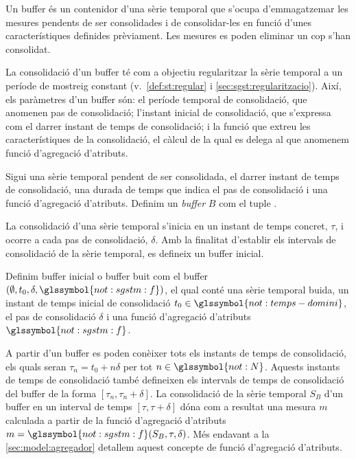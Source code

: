 Un buffer és un contenidor d'una sèrie temporal que s'ocupa
d'emmagatzemar les mesures pendents de ser consolidades i de
consolidar-les en funció d'unes característiques definides
prèviament. Les mesures es poden eliminar un cop s'han consolidat.

La consolidació d'un buffer té com a objectiu regularitzar la sèrie
temporal a un període de mostreig constant
(v.~\autoref{def:st:regular} i \autoref{sec:sgst:regularitzacio}).
Així, els paràmetres d'un buffer són: el període temporal de
consolidació, que anomenen pas de consolidació; l'instant inicial de
consolidació, que s'expressa com el darrer instant de temps de
consolidació; i la funció que extreu les
característiques de la consolidació, el càlcul de la qual es delega al
que anomenem funció d'agregació d'atributs.


\begin{definition}[Buffer]
  Sigui  una sèrie temporal pendent de
  ser consolidada,  el darrer
  instant de temps de consolidació,
   una durada de temps que
  indica el pas de consolidació i  una
  funció d'agregació d'atributs.  Definim un \emph{buffer} $B$ com el
  tuple
  .
\end{definition}

La consolidació d'una sèrie temporal s'inicia en un instant de temps
concret, $\tau$, i ocorre a cada pas de consolidació, $\delta$. Amb la
finalitat d'establir els intervals de consolidació de la sèrie
temporal, es defineix un buffer inicial.

\begin{definition}\label{def:model:buffer_buit}
  Definim buffer inicial o buffer buit com el buffer $(\emptyset,t_0,
  \delta, \glssymbol{not:sgstm:f})$, el qual conté una sèrie temporal
  buida, un instant de temps inicial de consolidació
  $t_0\in\glssymbol{not:temps-domini}$, el pas de consolidació $\delta$ i una
  funció d'agregació d'atributs $\glssymbol{not:sgstm:f}$.
\end{definition}

A partir d'un buffer es poden conèixer tots els instants de temps de
consolidació, els quals seran $\tau_n=t_0+n\delta$ per tot
$n\in\glssymbol{not:N}$. Aquests instants de temps de consolidació
també defineixen els intervals de temps de consolidació del buffer de
la forma $[\tau_n,\tau_n+\delta]$. La consolidació de la sèrie
temporal $S_B$ d'un buffer en un interval de temps
$[\tau,\tau+\delta]$ dóna com a resultat una mesura $m$
calculada a partir de la funció d'agregació d'atributs $m =
\glssymbol{not:sgstm:f}(S_B,\tau,\delta)$. Més endavant a la
\autoref{sec:model:agregador} detallem aquest concepte de funció
d'agregació d'atributs.


